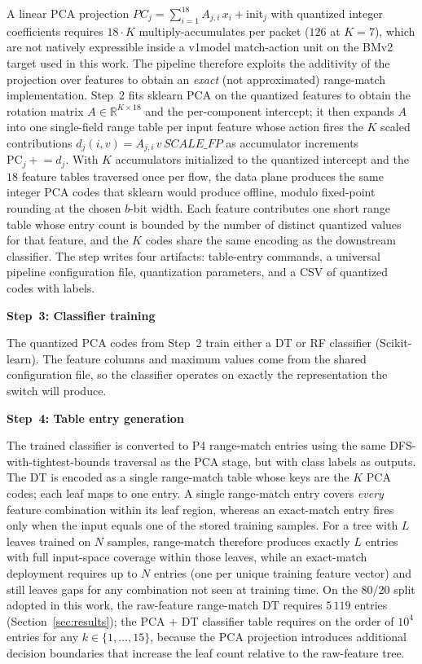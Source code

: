 \documentclass[runningheads]{llncs}
\begin{document}
A linear PCA projection $PC_j = \sum_{i=1}^{18} A_{j,i}\, x_i + \mathrm{init}_j$ with quantized integer coefficients requires $18{\cdot}K$ multiply-accumulates per packet ($126$ at $K{=}7$), which are not natively expressible inside a v1model match-action unit on the BMv2 target used in this work. The pipeline therefore exploits the additivity of the projection over features to obtain an \emph{exact} (not approximated) range-match implementation. Step~2 fits sklearn PCA on the quantized features to obtain the rotation matrix $A\!\in\!\mathbb{R}^{K\times 18}$ and the per-component intercept; it then expands $A$ into one single-field range table per input feature whose action fires the $K$ scaled contributions $d_j(i, v) = A_{j,i}\,v\,\mathit{SCALE\_FP}$ as accumulator increments $\mathrm{PC}_j \mathrel{+}= d_j$. With $K$ accumulators initialized to the quantized intercept and the $18$ feature tables traversed once per flow, the data plane produces the same integer PCA codes that sklearn would produce offline, modulo fixed-point rounding at the chosen $b$-bit width. Each feature contributes one short range table whose entry count is bounded by the number of distinct quantized values for that feature, and the $K$ codes share the same encoding as the downstream classifier. The step writes four artifacts: table-entry commands, a universal pipeline configuration file, quantization parameters, and a CSV of quantized codes with labels.

\noindent\textbf{Step~3: Classifier training}

The quantized PCA codes from Step~2 train either a DT or RF classifier (Scikit-learn). The feature columns and maximum values come from the shared configuration file, so the classifier operates on exactly the representation the switch will produce.

\noindent\textbf{Step~4: Table entry generation}

The trained classifier is converted to P4 range-match entries using the same DFS-with-tightest-bounds traversal as the PCA stage, but with class labels as outputs. The DT is encoded as a single range-match table whose keys are the $K$ PCA codes; each leaf maps to one entry. A single range-match entry covers \emph{every} feature combination within its leaf region, whereas an exact-match entry fires only when the input equals one of the stored training samples. For a tree with $L$ leaves trained on $N$ samples, range-match therefore produces exactly $L$ entries with full input-space coverage within those leaves, while an exact-match deployment requires up to $N$ entries (one per unique training feature vector) and still leaves gaps for any combination not seen at training time. On the 80/20 split adopted in this work, the raw-feature range-match DT requires $5\,119$ entries (Section~\ref{sec:results}); the PCA $+$ DT classifier table requires on the order of $10^4$ entries for any $k\!\in\!\{1,\dots,15\}$, because the PCA projection introduces additional decision boundaries that increase the leaf count relative to the raw-feature tree.
\end{document}
